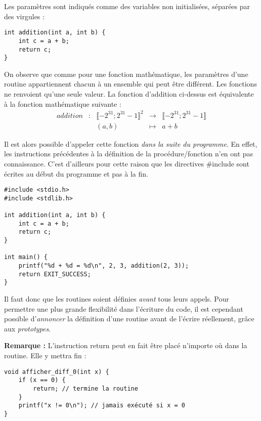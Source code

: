 \documentclass[../../../main.tex]{subfiles}
\begin{document}
Les paramètres sont indiqués comme des variables non initialisées, séparées par des virgules :
\begin{verbatim}
int addition(int a, int b) {
	int c = a + b;
	return c;
}
\end{verbatim}
On observe que comme pour une fonction mathématique, les paramètres d'une routine appartiennent chacun à un ensemble qui peut être différent. Les fonctions ne renvoient qu'une seule valeur. La fonction d'addition ci-dessus est équivalente à la fonction mathématique suivante :
$$
\begin{array}{ccccl}
addition & : & \llbracket{-2^{31}}; 2^{31}-1\rrbracket^{2} & \rightarrow & \llbracket{-2^{31}}; 2^{31}-1\rrbracket \\
 & & (a, b) & \mapsto & a + b
\end{array}
$$

Il est alors possible d'appeler cette fonction \textit{dans la suite du programme}. En effet, les instructions précédentes à la définition de la procédure/fonction n'en ont pas connaissance. C'est d'ailleurs pour cette raison que les directives \textsf{\#include} sont écrites au début du programme et pas à la fin.
\begin{verbatim}
#include <stdio.h>
#include <stdlib.h>

int addition(int a, int b) {
	int c = a + b;
	return c;
}

int main() {
	printf("%d + %d = %d\n", 2, 3, addition(2, 3));
	return EXIT_SUCCESS;
}
\end{verbatim}
Il faut donc que les routines soient définies \textit{avant} tous leurs appels. Pour permettre une plus grande flexibilité dans l'écriture du code, il est cependant possible d'\textit{annoncer} la définition d'une routine avant de l'écrire réellement, grâce aux \textit{prototypes}.
 
\textbf{Remarque :} L'instruction \textsf{return} peut en fait être placé n'importe où dans la routine. Elle y mettra fin :
\begin{verbatim}
void afficher_diff_0(int x) {
	if (x == 0) {
		return; // termine la routine
	}
	printf("x != 0\n"); // jamais exécuté si x = 0
}
\end{verbatim}
\end{document}
